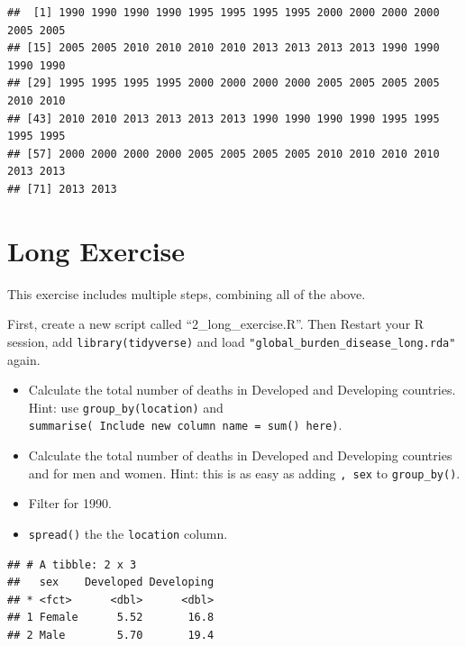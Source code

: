\documentclass[]{book}
\makeatletter
\newenvironment{Shaded}{\begin{snugshade}}{\end{snugshade}}
\newcommand{\KeywordTok}[1]{\textcolor[rgb]{0.13,0.29,0.53}{\textbf{#1}}}
\newcommand{\StringTok}[1]{\textcolor[rgb]{0.31,0.60,0.02}{#1}}
\newcommand{\OperatorTok}[1]{\textcolor[rgb]{0.81,0.36,0.00}{\textbf{#1}}}
\newcommand{\NormalTok}[1]{#1}
\providecommand{\tightlist}{%
  \setlength{\itemsep}{0pt}\setlength{\parskip}{0pt}}
\newenvironment{kframe}{%
\medskip{}
\setlength{\fboxsep}{.8em}
 \def\at@end@of@kframe{}%
 \ifinner\ifhmode%
  \def\at@end@of@kframe{\end{minipage}}%
  \begin{minipage}{\columnwidth}%
 \fi\fi%
 \def\FrameCommand##1{\hskip\@totalleftmargin \hskip-\fboxsep
 \colorbox{shadecolor}{##1}\hskip-\fboxsep
     \hskip-\linewidth \hskip-\@totalleftmargin \hskip\columnwidth}%
 \MakeFramed {\advance\hsize-\width
   \@totalleftmargin\z@ \linewidth\hsize
   \@setminipage}}%
 {\par\unskip\endMakeFramed%
 \at@end@of@kframe}
\renewenvironment{Shaded}{\begin{kframe}}{\end{kframe}}
\makeatother
\begin{document}
\begin{Shaded}
\end{Shaded}

\begin{verbatim}
##  [1] 1990 1990 1990 1990 1995 1995 1995 1995 2000 2000 2000 2000 2005 2005
## [15] 2005 2005 2010 2010 2010 2010 2013 2013 2013 2013 1990 1990 1990 1990
## [29] 1995 1995 1995 1995 2000 2000 2000 2000 2005 2005 2005 2005 2010 2010
## [43] 2010 2010 2013 2013 2013 2013 1990 1990 1990 1990 1995 1995 1995 1995
## [57] 2000 2000 2000 2000 2005 2005 2005 2005 2010 2010 2010 2010 2013 2013
## [71] 2013 2013
\end{verbatim}

\newpage 

\section{Long Exercise}\label{long-exercise}

This exercise includes multiple steps, combining all of the above.

First, create a new script called ``2\_long\_exercise.R''. Then Restart
your R session, add \texttt{library(tidyverse)} and load
\texttt{"global\_burden\_disease\_long.rda"} again.

\begin{itemize}
\tightlist
\item
  Calculate the total number of deaths in Developed and Developing
  countries. Hint: use \texttt{group\_by(location)} and
  \texttt{summarise(\ Include\ new\ column\ name\ =\ sum()\ here)}.
\item
  Calculate the total number of deaths in Developed and Developing
  countries and for men and women. Hint: this is as easy as adding
  \texttt{,\ sex} to \texttt{group\_by()}.
\item
  Filter for 1990.
\item
  \texttt{spread()} the the \texttt{location} column.
\end{itemize}

\begin{verbatim}
## # A tibble: 2 x 3
##   sex    Developed Developing
## * <fct>      <dbl>      <dbl>
## 1 Female      5.52       16.8
## 2 Male        5.70       19.4
\end{verbatim}
\end{document}
